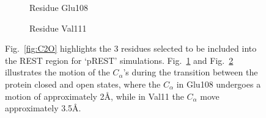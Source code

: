 \begin{figure}[!ht]
\begin{subfigure}{.4\textwidth}
   \caption{Residue Glu108}
   \label{fig:Glu108-C2O}
\end{subfigure}\hfill
\begin{subfigure}{.5\textwidth}
   \centering
   \caption{Residue Val111}
   \label{fig:Val111-C2O}
\end{subfigure}\hfill
\caption{Fig.~\ref{fig:C2O} highlights the 3 residues selected to be included into the REST region for `pREST' simulations. 
Fig.~\ref{fig:Glu108-C2O} and Fig.~\ref{fig:Val111-C2O} illustrates the motion of the $C_{\alpha}$'s during the transition between the protein closed and open states, where the $C_{\alpha}$ in Glu108 undergoes a motion of approximately 2\AA, while in Val11 the $C_{\alpha}$ move approximately 3.5\AA.}
\label{fig:pRESTresidues}
\end{figure}

